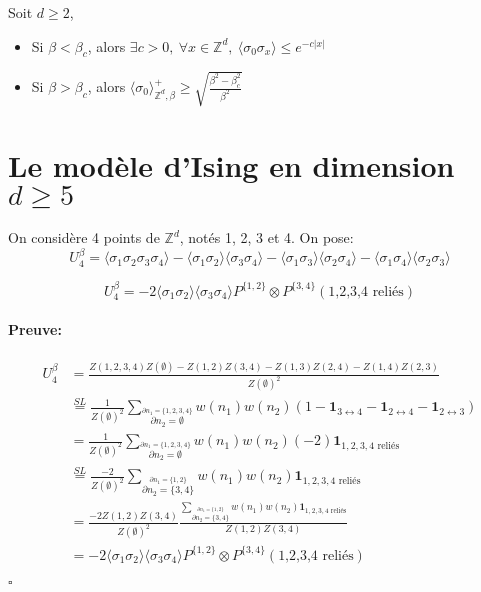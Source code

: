 \documentclass[a4paper,12pt]{report}
\newenvironment{preuve}{\paragraph{Preuve:}}{\hfill$\square$}
\begin{document}
\begin{thm}
Soit $d \geq 2$,
\begin{itemize}
\item Si $\beta < \beta_c$, alors $\exists c >0, \ \forall x \in \mathbb{Z}^d, \ \langle \sigma_0 \sigma_x \rangle \leq e^{-c \vert x \vert}$
\item Si $\beta > \beta_c$, alors $\langle \sigma_0 \rangle^+_{\mathbb{Z}^d,\beta} \geq \sqrt{\frac{\beta^2 - \beta_c^2}{\beta^2}}$
\end{itemize}
\end{thm}
\newpage

\section{Le modèle d'Ising en dimension $d \geq 5$}

On considère 4 points de $\mathbb{Z}^d$, notés 1, 2, 3 et 4. On pose:
$$
U_4^{\beta} = \langle \sigma_1 \sigma_2 \sigma_3 \sigma_4 \rangle - \langle \sigma_1 \sigma_2 \rangle \langle \sigma_3 \sigma_4 \rangle - \langle \sigma_1 \sigma_3 \rangle \langle \sigma_2 \sigma_4 \rangle - \langle \sigma_1 \sigma_4 \rangle \langle \sigma_2 \sigma_3 \rangle
$$

\begin{prop}
$$
U_4^{\beta} = -2\langle \sigma_1 \sigma_2 \rangle \langle \sigma_3 \sigma_4 \rangle P^{\{1,2\}} \otimes P^{\{3,4\}}(\text{1,2,3,4 reliés})
$$
\end{prop}

\begin{preuve}

\begin{align*}
U_4^{\beta} 
&= \frac{Z(1,2,3,4)Z(\emptyset) - Z(1,2)Z(3,4) - Z(1,3)Z(2,4) - Z(1,4)Z(2,3)}{Z(\emptyset)^2} \\
&\overset{SL}{=} \frac{1}{Z(\emptyset)^2} \sum_{\overset{\partial n_1 = \{1,2,3,4\}}{\partial n_2 =\emptyset}} w(n_1) w(n_2) (1 - \mathbf{1}_{3 \leftrightarrow 4} - \mathbf{1}_{2 \leftrightarrow 4} - \mathbf{1}_{2 \leftrightarrow 3}) \\
&= \frac{1}{Z(\emptyset)^2} \sum_{\overset{\partial n_1 = \{1,2,3,4\}}{\partial n_2 =\emptyset}} w(n_1) w(n_2) (-2) \mathbf{1}_{1,2,3,4 \text{ reliés}} \\
&\overset{SL}{=} \frac{-2}{Z(\emptyset)^2} \sum_{\overset{\partial n_1 = \{1,2\}}{\partial n_2 =\{3,4\}}} w(n_1) w(n_2) \mathbf{1}_{1,2,3,4 \text{ reliés}} \\
&= \frac{-2 Z(1,2) Z(3,4)}{Z(\emptyset)^2}
\frac{ \sum_{\overset{\partial n_1 = \{1,2\}}{\partial n_2 =\{3,4\}}} w(n_1) w(n_2) \mathbf{1}_{1,2,3,4 \text{ reliés}}}{Z(1,2) Z(3,4)} \\
&= -2\langle \sigma_1 \sigma_2 \rangle \langle \sigma_3 \sigma_4 \rangle P^{\{1,2\}} \otimes P^{\{3,4\}}(\text{1,2,3,4 reliés})
\end{align*}

\end{preuve}
\end{document}
